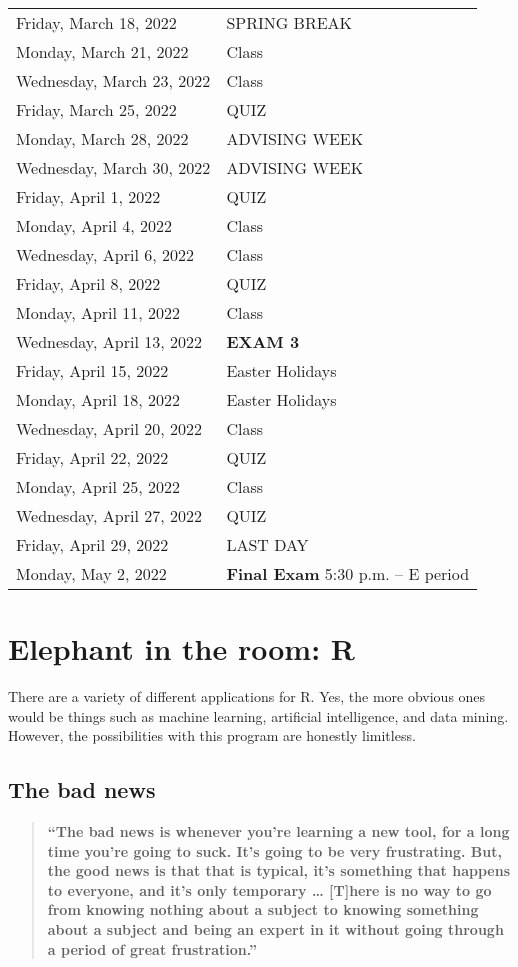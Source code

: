 \documentclass[
]{book}
\begin{document}
\begin{longtable}[]{@{}ll@{}}
Friday, March 18, 2022 & SPRING BREAK \\
Monday, March 21, 2022 & Class \\
Wednesday, March 23, 2022 & Class \\
Friday, March 25, 2022 & QUIZ \\
Monday, March 28, 2022 & ADVISING WEEK \\
Wednesday, March 30, 2022 & ADVISING WEEK \\
Friday, April 1, 2022 & QUIZ \\
Monday, April 4, 2022 & Class \\
Wednesday, April 6, 2022 & Class \\
Friday, April 8, 2022 & QUIZ \\
Monday, April 11, 2022 & Class \\
Wednesday, April 13, 2022 & \textbf{EXAM 3} \\
Friday, April 15, 2022 & Easter Holidays \\
Monday, April 18, 2022 & Easter Holidays \\
Wednesday, April 20, 2022 & Class \\
Friday, April 22, 2022 & QUIZ \\
Monday, April 25, 2022 & Class \\
Wednesday, April 27, 2022 & QUIZ \\
Friday, April 29, 2022 & LAST DAY \\
Monday, May 2, 2022 & \textbf{Final Exam} 5:30 p.m. -- E period \\
\bottomrule
\end{longtable}

\hypertarget{elephant-in-the-room-r}{%
\chapter{\texorpdfstring{Elephant in the room: \textbf{R}}{Elephant in the room: R}}\label{elephant-in-the-room-r}}

There are a variety of different applications for R. Yes, the more obvious ones would be things such as machine learning, artificial intelligence, and data mining. However, the possibilities with this program are honestly limitless.

\hypertarget{the-bad-news}{%
\section{The bad news}\label{the-bad-news}}

\begin{quote}
\textbf{``The bad news is whenever you're learning a new tool, for a long time you're going to suck. It's going to be very frustrating. But, the good news is that that is typical, it's something that happens to everyone, and it's only temporary \ldots{} {[}T{]}here is no way to go from knowing nothing about a subject to knowing something about a subject and being an expert in it without going through a period of great frustration.''}
\end{quote}
\end{document}
